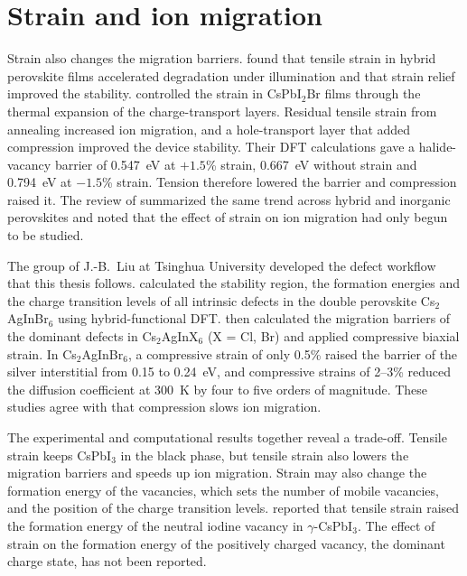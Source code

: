 \section{Strain and ion migration}
\label{sec:strain-migration}

Strain also changes the migration barriers. \citet{Zhao2017} found that tensile strain in hybrid perovskite films accelerated degradation under illumination and that strain relief improved the stability. \citet{Xue2020} controlled the strain in CsPbI$_2$Br films through the thermal expansion of the charge-transport layers. Residual tensile strain from annealing increased ion migration, and a hole-transport layer that added compression improved the device stability. Their DFT calculations gave a halide-vacancy barrier of 0.547~eV at $+1.5$\% strain, 0.667~eV without strain and 0.794~eV at $-1.5$\% strain. Tension therefore lowered the barrier and compression raised it. The review of \citet{Wu2021} summarized the same trend across hybrid and inorganic perovskites and noted that the effect of strain on ion migration had only begun to be studied.

The group of J.-B.~Liu at Tsinghua University developed the defect workflow that this thesis follows. \citet{Xu2017} calculated the stability region, the formation energies and the charge transition levels of all intrinsic defects in the double perovskite Cs$_2$AgInBr$_6$ using hybrid-functional DFT. \citet{Xu2019} then calculated the migration barriers of the dominant defects in Cs$_2$AgInX$_6$ (X = Cl, Br) and applied compressive biaxial strain. In Cs$_2$AgInBr$_6$, a compressive strain of only 0.5\% raised the barrier of the silver interstitial from 0.15 to 0.24~eV, and compressive strains of 2--3\% reduced the diffusion coefficient at 300~K by four to five orders of magnitude. These studies agree with \citet{Xue2020} that compression slows ion migration.

The experimental and computational results together reveal a trade-off. Tensile strain keeps CsPbI$_3$ in the black phase, but tensile strain also lowers the migration barriers and speeds up ion migration. Strain may also change the formation energy of the vacancies, which sets the number of mobile vacancies, and the position of the charge transition levels. \citet{Zhang2025} reported that tensile strain raised the formation energy of the neutral iodine vacancy in $\gamma$-CsPbI$_3$. The effect of strain on the formation energy of the positively charged vacancy, the dominant charge state, has not been reported.

